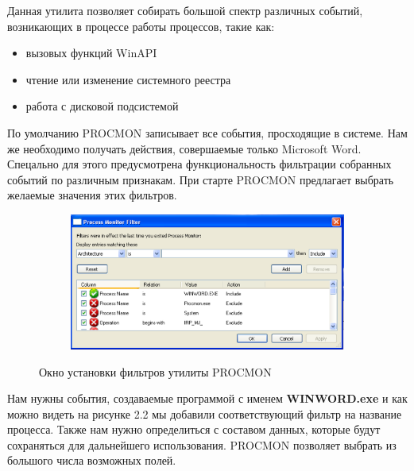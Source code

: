Данная утилита позволяет собирать большой спектр различных событий, возникающих в процессе работы процессов, такие как:
\begin{itemize}
\item вызовых функций WinAPI
\item чтение или изменение системного реестра
\item работа с дисковой подсистемой
\end{itemize}

По умолчанию PROCMON записывает все события, просходящие в системе. 
Нам же необходимо получать действия, совершаемые только Microsoft Word.
Спецально для этого предусмотрена функциональность фильтрации собранных событий по различным признакам.
При старте PROCMON предлагает выбрать желаемые значения этих фильтров.

\begin{figure}[ht]
	\centering
    \begin{subfigure}[b]{1\textwidth}
    \centering
        \includegraphics[scale=0.5]{procmon_filters.png}        
    \end{subfigure}
 
    \caption{Окно установки фильтров утилиты PROCMON}
    \label{fig_parsetree}
\end{figure}

\newpage
Нам нужны события, создаваемые программой с именем \textbf{WINWORD.exe} и как можно видеть на рисунке 2.2 мы добавили соответствующий фильтр на название процесса.
Также нам нужно определиться с составом данных, которые будут сохраняться для дальнейшего использования.
PROCMON позволяет выбрать из большого числа возможных полей.

